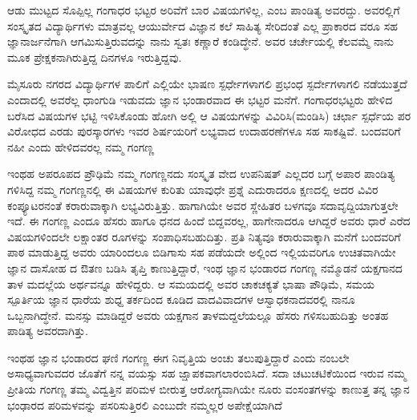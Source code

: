{ಆಡು ಮುಟ್ಟದ ಸೊಪ್ಪಿಲ್ಲ ಗಂಗಾಧರ ಭಟ್ಟರ ಅರಿವೆಗೆ ಬಾರ ವಿಷಯಗಳಿಲ್ಲ, ಎಂಬ ಪಾಂಡಿತ್ಯ ಅವರದ್ದು.  ಅವರಲ್ಲಿಗೆ ಸಂಸ್ಕೃತದ ವಿದ್ಯಾರ್ಥಿಗಳು ಮಾತ್ರವಲ್ಲ  ಆಯುರ್ವೇದ ವಿಜ್ಞಾನ ಕಲೆ ಸಾಹಿತ್ಯ ಸೇರಿದಂತೆ  ಎಲ್ಲ ಪ್ರಾಕಾರದ ವರೂ ಸಹ ಜ್ಞಾನಾರ್ಜನೆಗಾಗಿ ಆಗಮಿಸುತ್ತಿರುವದನ್ನು ನಾನು ಸ್ವತಃ ಕಣ್ಣಾರೆ  ಕಂಡಿದ್ಧೇನೆ. ಅವರ ಚರ್ಚೇಯಲ್ಲಿ ಕೆಲವಮ್ಮೆ ನಾನು  ಮೂಕ ಪ್ರೇಕ್ಷಕನಾಗಿರುತ್ತಿದ್ದ ದಿನಗಳೂ ಇರುತ್ತಿದ್ದವು.

ಮೈಸೂರು ನಗರದ ವಿದ್ಯಾರ್ಥಿಗಳ ಪಾಲಿಗೆ ಎಲ್ಲಿಯೇ ಭಾಷಣ ಸ್ಪರ್ಧೇಗಳಾಗಲಿ  ಪ್ರಭಂಧ ಸ್ಪರ್ದೇಗಳಾಗಲಿ  ನಡೆಯುತ್ತದೆ ಎಂದಾದಲ್ಲಿ   ಅವರೆಲ್ಲ ಧಾಂಗುಡಿ ಇಡುವದು ಜ್ಞಾನ ಭಂಡಾರವಾದ ಈ ಭಟ್ಟರ ಮನೆಗೆ.  ಗಂಗಾಧರಭಟ್ಟರು ಹೇಳಿದ  ಬರೆಸಿದ ವಿಷಯಗಳ ಭಟ್ಟಿ ಇಳಿಸಿಕೊಂಡು ಹೋಗಿ   ಅಲ್ಲಿ ಆ ವಿಷಯಗಳನ್ನು ವಿವಿರಿಸಿ(ಮಂಡಿಸಿ)   ಚರ್ಛಾ ಸ್ಪರ್ಧೆಯ ಪರ ವಿರೋಧದ ಎರಡು ಪುರಸ್ಕಾರಗಳು ಇವರ ಶಿರ್ಷಯರಿಗೆ ಲಭ್ಯವಾದ ಉದಾಹರಣೆಗಳೂ ಸಹ ಸಾಕಷ್ಟಿವೆ. ಬಂದವರಿಗೆ ನಹೀ ಎಂದು ಹೇಳಿದವರಲ್ಲ ನಮ್ಮ ಗಂಗಣ್ಣ  

ಇಂಥಹ ಅಪರೂಪದ ಪ್ರೌಢಿಮೆ ನಮ್ಮ ಗಂಗಣ್ಣನದು  ಸಂಸ್ಕೃತ ವೇದ ಉಪನಿಷತ್ ಎಲ್ಲದರ ಬಗ್ಗೆ ಅಪಾರ ಪಾಂಡಿತ್ಯ ಗಳಿಸಿದ್ದ ನಮ್ಮ ಗಂಗಣ್ಣನಲ್ಲಿ ಈ ವಿಷಯಗಳ ಕುರಿತು ಯಾವುಧೇ ಪ್ರಶ್ನೆ ಎದುರಾದರೂ ಕ್ಷಣದಲ್ಲಿ ಅದರ ವಿವಿರ ಕಂಪ್ಯೂಟರನಂತೆ ಕರಾರುವಾಕ್ಕಾಗಿ ಲಭ್ಯವಿರುತ್ತಿತ್ತು. ಹಾಗಾಗಿಯೇ ಅವರ ಸ್ಣೇಹಿತರ ಬಳಗವೂ ಸದಾವೃದ್ದಿಯಾಗುತ್ತಲೇ ಇದೆ.  ಈ ಗಂಗಣ್ಣ ಎಂದೂ ಹೆಸರು ಹಾಗೂ ಧನದ ಹಿಂದೆ ಬಿದ್ದವರಲ್ಲ, ಹಾಗೇನಾದರೂ ಆಗಿದ್ದರೆ ಅವರು ಧಾರೆ ಎರೆದ  ವಿಷಯಗಳಿಂದಲೇ  ಲಕ್ಷಾಂತರ ರೂಗಳನ್ನು ಸಂಪಾಧಿಸ\-ಬಹುದಿತ್ತು. ಪ್ರತಿ ನಿತ್ಯವೂ ಕರಾರುವಾಕ್ಕಾಗಿ ಮನೆಗೆ ಬಂದವರಿಗೆ ಪಾಠ ಮಾಡುತ್ತಿದ್ದ ಅವರು ಯಾರಿಂದಲೂ ಬಿಡಿಗಾಸು ಸಹ ಪಡೆಯದೇ ಅಲ್ಲಿಂದ ಇಲ್ಲಿಯವರಿಗೂ ಉಚಿತವಾಗಿಯೇ ಜ್ಞಾನ ದಾಸೋಹ ದ ಔತಣ  ಬಡಿಸಿ ತೃಪ್ತಿ ಕಾಣುತ್ತಿದ್ದಾರೆ,    ಇಂಥ ಜ್ಞಾನ ಭಂಡಾರದ ಗಂಗಣ್ಣ  ನಮ್ಮೊಡನೆ ಯಕ್ಷಗಾನದ ತಾಳ ಮದಲ್ಲೆಯ ಅರ್ಥವನ್ನೂ ಹೇಳಿದ್ದರು.  ಆ ಸಮಯದಲ್ಲಿ ಅವರ ಚಾಕಚಕ್ಯತೆ ಭಾಷಾ ಪೌಢಿಮೆ, ಸಮಯ ಸ್ಪೂರ್ತಿಯ ಜ್ಞಾನ ಧಾರೆಯ ಶುಧ್ದ ತರ್ಕದಿಂದ ಕೂಡಿದ  ವಾದವಿವಾದಗಳ ಆಸ್ವಾಧಕನಾದವರಲ್ಲಿ ನಾನೂ ಒಬ್ಬನಾಗಿದ್ಧೇನೆ. ಮನಸ್ಸು ಮಾಡಿದ್ದರೆ ಅವರು ಯಕ್ಷಗಾನ ತಾಳಮದ್ದಲೆಯಲ್ಲೂ ಹೆಸರು ಗಳಿಸಬಹುದಿತ್ತು ಅಂತಹ ಪಾಡಿತ್ಯ ಅವರದಾಗಿತ್ತು.  

ಇಂಥಹ ಜ್ಞಾನ ಭಂಡಾರದ ಘಣಿ ಗಂಗಣ್ಣ ಈಗ ನಿವೃತ್ತಿಯ ಅಂಚು ತಲುಪುತ್ತಿದ್ದಾರೆ ಎಂದು ನಂಬಲೇ ಅಸಾಧ್ಯವಾಗುವದರ ಜೊತೆಗೆ ನನ್ನ ವಯಸ್ಸು  ಸಹ ಜ್ಷಾಪಕವಾಗಲಾರಂಬಿಸಿದೆ. ಸದಾ ಚಟುಚಟಿಕೆಯಿಂದ ಇರುವ ನಮ್ಮ ಪ್ರೀತಿಯ ಗಂಗಣ್ಣ    ತಮ್ಮ ವಿದ್ವತ್ತಿನ ಪರಿಮಳ ಬೀರುತ್ತ  ಆರೋಗ್ಯವಾಗಿಯೇ  ನೂರು ವಂಸಂತಗಳನ್ನು  ಕಾಣುತ್ತ  ತನ್ನ ಜ್ಞಾನ ಭಂಢಾರದ ಪರಿಮಳವನ್ನು ಪಸರಿಸುತ್ತಿರಲಿ ಎಂಬುದೇ ನಮ್ಮಲ್ಲರ ಅಪೇಕ್ಷೆಯಾಗಿದೆ


\articleend
}
